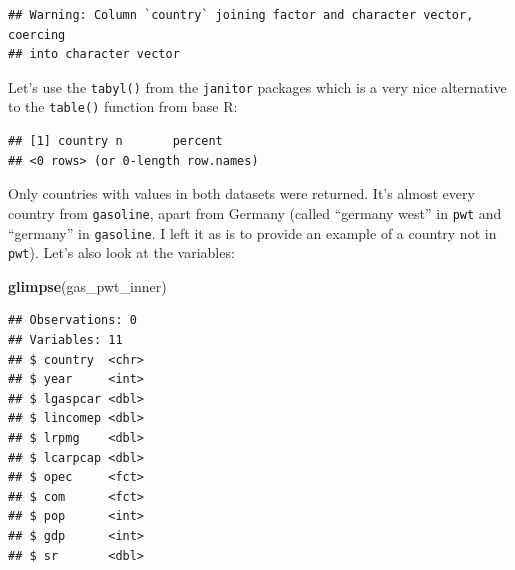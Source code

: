 \documentclass[]{gitbook}
\newenvironment{Shaded}{\begin{snugshade}}{\end{snugshade}}
\newcommand{\DataTypeTok}[1]{\textcolor[rgb]{0.13,0.29,0.53}{#1}}
\newcommand{\KeywordTok}[1]{\textcolor[rgb]{0.13,0.29,0.53}{\textbf{#1}}}
\newcommand{\NormalTok}[1]{#1}
\newcommand{\OperatorTok}[1]{\textcolor[rgb]{0.81,0.36,0.00}{\textbf{#1}}}
\newcommand{\StringTok}[1]{\textcolor[rgb]{0.31,0.60,0.02}{#1}}
\begin{document}
\begin{Shaded}
\end{Shaded}

\begin{verbatim}
## Warning: Column `country` joining factor and character vector, coercing
## into character vector
\end{verbatim}

Let's use the \texttt{tabyl()} from the \texttt{janitor} packages which is a very nice alternative to the \texttt{table()}
function from base R:

\begin{Shaded}
\end{Shaded}

\begin{verbatim}
## [1] country n       percent
## <0 rows> (or 0-length row.names)
\end{verbatim}

Only countries with values in both datasets were returned. It's almost every country from \texttt{gasoline},
apart from Germany (called ``germany west'' in \texttt{pwt} and ``germany'' in \texttt{gasoline}. I left it as is to
provide an example of a country not in \texttt{pwt}). Let's also look at the variables:

\begin{Shaded}
\begin{Highlighting}[]
\KeywordTok{glimpse}\NormalTok{(gas_pwt_inner)}
\end{Highlighting}
\end{Shaded}

\begin{verbatim}
## Observations: 0
## Variables: 11
## $ country  <chr> 
## $ year     <int> 
## $ lgaspcar <dbl> 
## $ lincomep <dbl> 
## $ lrpmg    <dbl> 
## $ lcarpcap <dbl> 
## $ opec     <fct> 
## $ com      <fct> 
## $ pop      <int> 
## $ gdp      <int> 
## $ sr       <dbl>
\end{verbatim}
\end{document}
